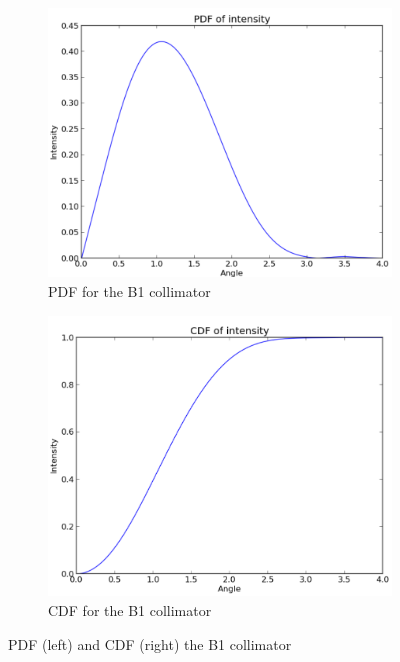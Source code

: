 \begin{figure}
    \centering
    
    \begin{subfigure}{0.5\textwidth}
        \centering
        \includegraphics[width=\textwidth]{Figures/B1_coll_pdf.png} %
        \caption{PDF for the B1 collimator}
    \end{subfigure}\hfill
    \begin{subfigure}{0.5\textwidth}
        \centering
        \includegraphics[width=\textwidth]{Figures/B1_coll_cdf.png} %
        \caption{CDF for the B1 collimator}
    \end{subfigure}
    \caption{PDF (left) and CDF (right) the B1 collimator }
    \label{fig:PDF_CDF_coll_B1}
\end{figure}

